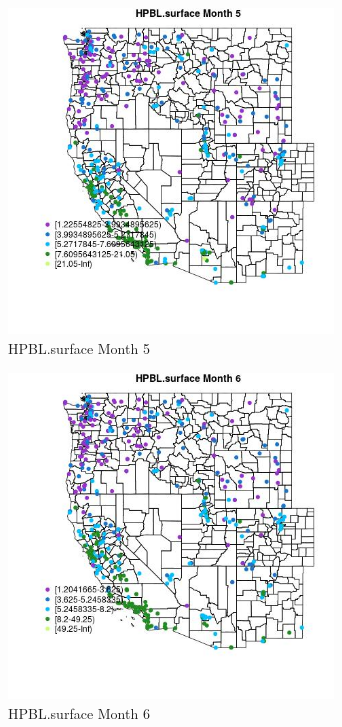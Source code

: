 \begin{figure} 
\centering  
\includegraphics[width=0.77\textwidth]{Code_Outputs/ML_input_report_ML_input_PM25_Step5_part_d_de_duplicated_aves_ML_input_MapObsMo5HPBLsurface.jpg} 
\caption{\label{fig:ML_input_report_ML_input_PM25_Step5_part_d_de_duplicated_aves_ML_inputMapObsMo5HPBLsurface}HPBL.surface Month 5} 
\end{figure} 
 

\begin{figure} 
\centering  
\includegraphics[width=0.77\textwidth]{Code_Outputs/ML_input_report_ML_input_PM25_Step5_part_d_de_duplicated_aves_ML_input_MapObsMo6HPBLsurface.jpg} 
\caption{\label{fig:ML_input_report_ML_input_PM25_Step5_part_d_de_duplicated_aves_ML_inputMapObsMo6HPBLsurface}HPBL.surface Month 6} 
\end{figure} 
 

